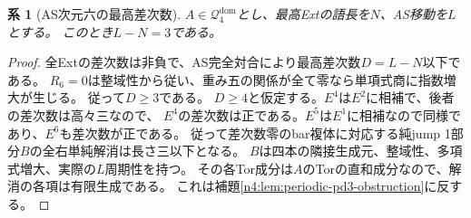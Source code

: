 \documentclass[11pt,a4paper]{ltjsarticle}
\newtheorem{corollary}[theorem]{系}
\theoremstyle{definition}
\begin{document}
\begin{corollary}[AS次元六の最高差次数]
\label{n4:cor:top-excess-three}
$A\in\mathcal Q_4^{\mathrm{dom}}$とし、最高Extの語長を$N$、AS移動を$L$とする。
このとき$L-N=3$である。
\end{corollary}
\begin{proof}
全Extの差次数は非負で、AS完全対合により最高差次数$D=L-N$以下である。
$R_6=0$は整域性から従い、重み五の関係が全て零なら単項式商に指数増大が生じる。
従って$D\ge3$である。
$D\ge4$と仮定する。$E^4$は$E^2$に相補で、後者の差次数は高々三なので、
$E^4$の差次数は正である。$E^5$は$E^1$に相補なので同様であり、$E^6$も差次数が正である。
従って差次数零のbar複体に対応する純jump 1部分$B$の全右単純解消は長さ三以下となる。
$B$は四本の隣接生成元、整域性、多項式増大、実際の$L$周期性を持つ。
その各Tor成分は$A$のTorの直和成分なので、解消の各項は有限生成である。
これは補題\ref{n4:lem:periodic-pd3-obstruction}に反する。
\end{proof}
\end{document}
